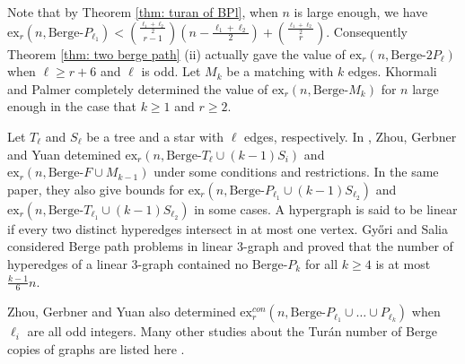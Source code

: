 \documentclass[12pt]{article}%
\newtheorem{theorem}{Theorem}[section]
\newcommand{\ber}{\text{Berge-}}
\newcommand{\exc}{ex^{con}_r}
\newcommand{\lf}{\left\lfloor}
\newcommand{\rf}{\right\rfloor}
\newcounter{cases}
\begin{document}
\par\noindent
Note that by Theorem \ref{thm: turan of BPl}, when $n$ is large enough, we have $\mathrm{ex}_{r}(n,\ber P_{\ell_1})<\binom{\frac{\ell_1+\ell_2}{2}}{r-1}(n-\frac{\ell_1+\ell_2}{2})+\binom{\frac{\ell_1+\ell_2}{2}}{r}$. Consequently Theorem \ref{thm: two berge path} (ii)  actually gave the value of $\mathrm{ex}_r(n,\ber 2P_\ell)$ when $\ell \geq r+6$ and $\ell$ is odd.
Let $M_k$ be a matching with $k$ edges. Khormali and Palmer \cite{KHORMALI2022103506} completely determined the value of $\mathrm{ex}_r(n,\ber M_k)$ for $n$ large enough in the case that $k\geq 1$ and $r\geq 2$.

Let $T_{\ell}$ and $S_{\ell}$ be a tree  and  a star with $\ell$ edges, respectively. In \cite{Zhou2025OnTP},  Zhou, Gerbner and Yuan detemined $\mathrm{ex}_{r}(n,\ber T_{\ell}\cup (k-1)S_i)$ and $\mathrm{ex}_{r}(n,\ber F\cup M_{k-1})$ under some conditions and restrictions. In the same paper, they also give bounds for $\mathrm{ex}_{r}(n,\ber P_{\ell_1}\cup (k-1)S_{\ell_2})$ and $\mathrm{ex}_{r}(n,\ber T_{\ell_1}\cup (k-1)S_{\ell_2})$ in some cases. A hypergraph is said to be linear if every two distinct hyperedges intersect in at most one vertex. Győri and Salia \cite{GYORI202536} considered Berge path problems in linear $3\text{-}$graph and proved that the number of hyperedges of a linear $3\text{-}$graph contained no $\ber P_{k}$ for all $k\geq 4$ is at most $\frac{k-1}{6}n$.

    Zhou, Gerbner and Yuan \cite{Zhou2025OnTP} also determined $\mathrm{ex}_{r}^{con}(n,\ber P_{\ell_1}\cup\ldots\cup P_{\ell_k})$ when $\ell_{i}$ are all odd integers. Many other studies about the Tur\'an number of Berge copies of graphs are listed here \cite{gerbner2024turan,gerbner2020general,gerbner2019asymptotics,ghosh2024book,gyHori2006triangle,gyHori2012hypergraphs}.
\end{document}
